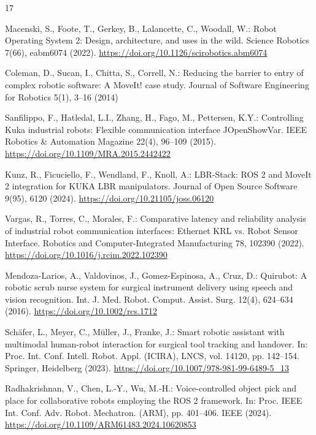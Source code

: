 \documentclass{svproc}
\begin{document}
\begin{thebibliography}{17}

Macenski, S., Foote, T., Gerkey, B., Lalancette, C., Woodall, W.: Robot Operating System 2: Design, architecture, and uses in the wild. Science Robotics 7(66), eabm6074 (2022). \url{https://doi.org/10.1126/scirobotics.abm6074}

Coleman, D., Sucan, I., Chitta, S., Correll, N.: Reducing the barrier to entry of complex robotic software: A MoveIt! case study. Journal of Software Engineering for Robotics 5(1), 3--16 (2014)

Sanfilippo, F., Hatledal, L.I., Zhang, H., Fago, M., Pettersen, K.Y.: Controlling Kuka industrial robots: Flexible communication interface JOpenShowVar. IEEE Robotics \& Automation Magazine 22(4), 96--109 (2015). \url{https://doi.org/10.1109/MRA.2015.2442422}

Kunz, R., Ficuciello, F., Wendland, F., Knoll, A.: LBR-Stack: ROS 2 and MoveIt 2 integration for KUKA LBR manipulators. Journal of Open Source Software 9(95), 6120 (2024). \url{https://doi.org/10.21105/joss.06120}

Vargas, R., Torres, C., Morales, F.: Comparative latency and reliability analysis of industrial robot communication interfaces: Ethernet KRL vs. Robot Sensor Interface. Robotics and Computer-Integrated Manufacturing 78, 102390 (2022). \url{https://doi.org/10.1016/j.rcim.2022.102390}

Mendoza-Larios, A., Valdovinos, J., Gomez-Espinosa, A., Cruz, D.: Quirubot: A robotic scrub nurse system for surgical instrument delivery using speech and vision recognition. Int. J. Med. Robot. Comput. Assist. Surg. 12(4), 624--634 (2016). \url{https://doi.org/10.1002/rcs.1712}

Schäfer, L., Meyer, C., Müller, J., Franke, J.: Smart robotic assistant with multimodal human-robot interaction for surgical tool tracking and handover. In: Proc. Int. Conf. Intell. Robot. Appl. (ICIRA), LNCS, vol. 14120, pp. 142--154. Springer, Heidelberg (2023). \url{https://doi.org/10.1007/978-981-99-6489-5_13}

Radhakrishnan, V., Chen, L.-Y., Wu, M.-H.: Voice-controlled object pick and place for collaborative robots employing the ROS 2 framework. In: Proc. IEEE Int. Conf. Adv. Robot. Mechatron. (ARM), pp. 401--406. IEEE (2024). \url{https://doi.org/10.1109/ARM61483.2024.10620853}


\end{thebibliography}
\end{document}

